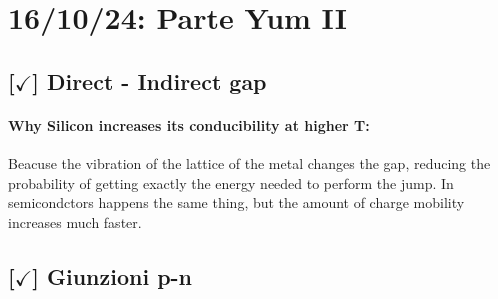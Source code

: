 \section{16/10/24: Parte Yum II}

\subsection{[$\checkmark$] Direct - Indirect gap}

\paragraph{Why Silicon increases its conducibility at higher T:} Beacuse the vibration of the lattice of the metal changes the gap, reducing the probability of getting exactly the energy needed to perform the jump. In semicondctors happens the same thing, but the amount of charge mobility increases much faster.

\subsection{[$\checkmark$] Giunzioni p-n}
